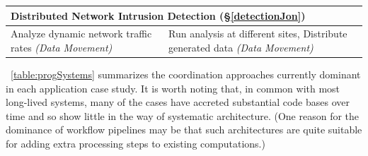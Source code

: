 \begin{table}[h]
\begin{scriptsize}
\begin{center}
\begin{tabular}{|p{6.7cm}|p{6.7cm}|}
\multicolumn{2}{|l|}{{\textbf{Distributed Network Intrusion Detection} (\S\ref{detectionJon})}} \\ \hline	
Analyze dynamic network traffic rates \emph{(Data Movement)} %
            &
Run analysis at different sites, Distribute generated data \emph{(Data Movement)} %
\\
		\hline

      \end{tabular}
    \end{center}
  \end{scriptsize}
\end{table}




\tablename~\ref{table:progSystems} summarizes the coordination approaches
currently dominant in each application case study. It is worth noting
that, in common with most long-lived systems, many of the cases
have accreted substantial code bases over time and so show little in
the way of systematic architecture. (One reason for the dominance of
workflow pipelines may be that such architectures are quite suitable for adding
extra processing steps to existing computations.)

